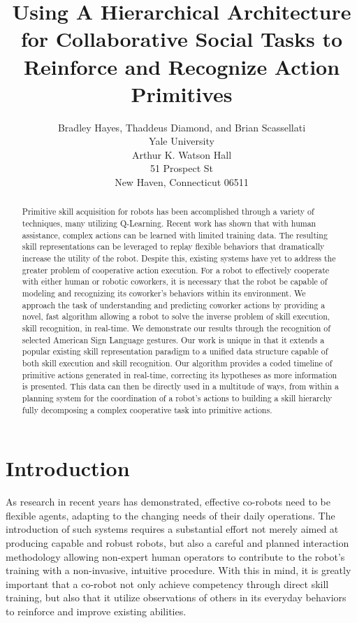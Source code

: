 \documentclass[letterpaper]{article}
\begin{document}
\title{Using A Hierarchical Architecture for Collaborative Social Tasks to Reinforce and Recognize Action Primitives}
\author{Bradley Hayes, Thaddeus Diamond, and Brian Scassellati\\
Yale University\\
Arthur K. Watson Hall\\
51 Prospect St\\
New Haven, Connecticut 06511\\
}

\maketitle

\begin{abstract}
Primitive skill acquisition for robots has been accomplished through a variety
of techniques, many utilizing Q-Learning. Recent work has shown that with human
assistance, complex actions can be learned with limited training data. The
resulting skill representations can be leveraged to replay flexible behaviors
that dramatically increase the utility of the robot. Despite this, existing
systems have yet to address the greater problem of cooperative action execution.
For a robot to effectively cooperate with either human or robotic coworkers,
it is necessary that the robot be capable of modeling and recognizing its
coworker’s behaviors within its environment. We approach the task of
understanding and predicting coworker actions by providing a novel, fast algorithm
allowing a robot to solve the inverse problem of skill execution, skill
recognition, in real-time. We demonstrate our results through the recognition of selected
American Sign Language gestures. Our work is unique in that it extends a popular existing skill
representation paradigm to a unified data structure capable of both skill execution and skill recognition. 
Our algorithm provides a coded timeline of
primitive actions generated in real-time, correcting its hypotheses as more
information is presented. This data can then be directly used in a multitude
of ways, from within a planning system for the coordination of a robot's
actions to building a skill hierarchy fully decomposing a complex cooperative 
task into primitive actions.
\end{abstract}

\section{Introduction}
\label{sec:intro}
	As research in recent years has demonstrated, effective co-robots need to be flexible agents, adapting to the changing needs of their daily operations. The introduction of such systems requires a substantial effort not merely aimed at producing capable and robust robots, but also a careful and planned interaction methodology allowing non-expert human operators to contribute to the robot's training with a non-invasive, intuitive procedure. With this in mind, it is greatly important that a co-robot not only achieve competency through direct skill training, but also that it utilize observations of others in its everyday behaviors to reinforce and improve existing abilities.
\end{document}
